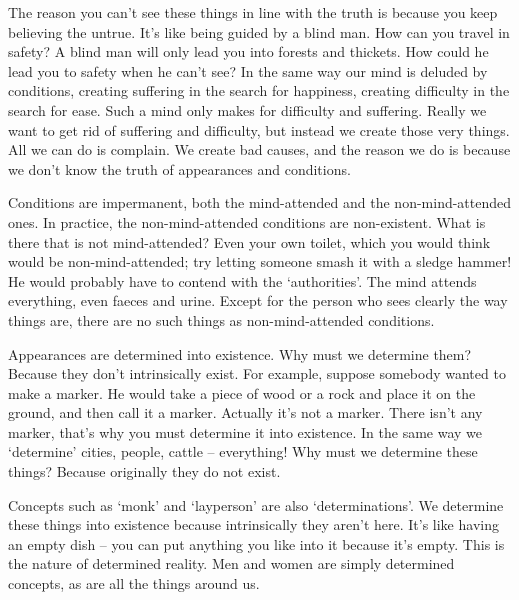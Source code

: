The reason you can't see these things in line with the truth is because you keep believing the untrue. It's like being guided by a blind man. How can you travel in safety? A blind man will only lead you into forests and thickets. How could he lead you to safety when he can't see? In the same way our mind is deluded by conditions, creating suffering in the search for happiness, creating difficulty in the search for ease. Such a mind only makes for difficulty and suffering. Really we want to get rid of suffering and difficulty, but instead we create those very things. All we can do is complain. We create bad causes, and the reason we do is because we don't know the truth of appearances and conditions.

Conditions are impermanent, both the mind-attended and the non-mind-attended ones. In practice, the non-mind-attended conditions are non-exist\-ent. What is there that is not mind-attended? Even your own toilet, which you would think would be non-mind-attended; try letting someone smash it with a sledge hammer! He would probably have to contend with the `authorities'. The mind attends everything, even faeces and urine. Except for the person who sees clearly the way things are, there are no such things as non-mind-attended conditions.

Appearances are determined into existence. Why must we determine them? Because they don't intrinsically exist. For example, suppose somebody wanted to make a marker. He would take a piece of wood or a rock and place it on the ground, and then call it a marker. Actually it's not a marker. There isn't any marker, that's why you must determine it into existence. In the same way we `determine' cities, people, cattle -- everything! Why must we determine these things? Because originally they do not exist.

Concepts such as `monk' and `layperson' are also `determinations'. We determine these things into existence because intrinsically they aren't here. It's like having an empty dish -- you can put anything you like into it because it's empty. This is the nature of determined reality. Men and women are simply determined concepts, as are all the things around us.

